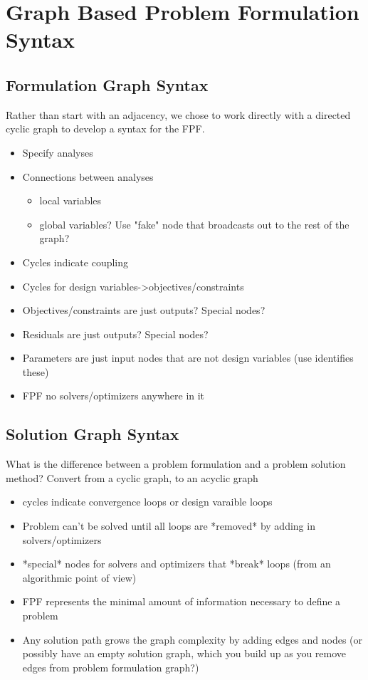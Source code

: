 \documentclass[]{aiaa-tc} %
\begin{document}
\section{Graph Based Problem Formulation Syntax}
    \subsection{Formulation Graph Syntax}
    Rather than start with an adjacency, we chose to work directly with a directed cyclic graph to develop a syntax for the FPF. 
    \begin{itemize}
        \item Specify analyses
        \item Connections between analyses 
            \begin{itemize}
                \item local variables
                \item global variables? Use "fake" node that broadcasts out to the rest of the graph? 
            \end{itemize}
        \item Cycles indicate coupling
        \item Cycles for design variables->objectives/constraints
        \item Objectives/constraints are just outputs? Special nodes? 
        \item Residuals are just outputs? Special nodes? 
        \item Parameters are just input nodes that are not design variables (use identifies these)
        \item FPF no solvers/optimizers anywhere in it
    \end{itemize}

    \subsection{Solution Graph Syntax}
    What is the difference between a problem formulation and a problem solution method? Convert from a cyclic graph, to an acyclic graph
    \begin{itemize}
        \item cycles indicate convergence loops or design varaible loops
        \item Problem can't be solved until all loops are *removed* by adding in solvers/optimizers
        \item *special* nodes for solvers and optimizers that *break* loops (from an algorithmic point of view)
        \item FPF represents the minimal amount of information necessary to define a problem
        \item Any solution path grows the graph complexity by adding edges and nodes (or possibly have an empty solution graph, which you build up 
        as you remove edges from problem formulation graph?)
    \end{itemize}
\end{document}
